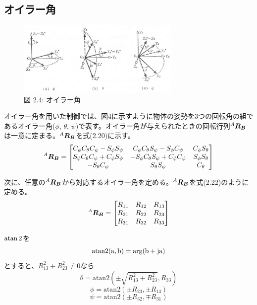 \documentclass{article}
\begin{document}
\subsection{オイラー角}
\begin{figure}[H]
    \centering
    \includegraphics[width=0.7\textwidth]{images/2_4.jpg}
    \caption{図 2.4: オイラー角}
    \label{fig:2.4}
\end{figure}

オイラー角を用いた制御では、図4に示すように物体の姿勢を3つの回転角の組であるオイラー角(\(\phi\), \(\theta\), \(\psi\))で表す。オイラー角が与えられたときの回転行列\(^{A}\vb*{R_B}\)は一意に定まる。\(^{A}\vb*{R_B}\)を式(2.20)に示す。
\begin{equation}
    ^{A}\vb*{R_B} = 
    \begin{bmatrix}
        C_{\phi}C_{\theta}C_{\psi}-S_{\phi}S_{\psi} & C_{\phi}C_{\theta}S_{\psi}-S_{\phi}C_{\psi} & C_{\phi}S_{\theta} \\
        S_{\phi}C_{\theta}C_{\psi}+C_{\phi}S_{\psi} & -S_{\phi}C_{\theta}S_{\psi}+C_{\phi}C_{\psi} & S_{\phi}S_{\theta} \\
        -S_{\theta}C_{\psi} & S_{\theta}S_{\psi} & C_{\theta}
    \end{bmatrix}
\end{equation}

次に、任意の\(^{A}\vb*{R_B}\)から対応するオイラー角を定める。\(^{A}\vb*{R_B}\)を式(2.22)のように定める。
\begin{equation}
    ^{A}\vb*{R_B} = 
    \begin{bmatrix}
        R_{11} & R_{12} & R_{13} \\
        R_{21} & R_{22} & R_{23} \\
        R_{31} & R_{32} & R_{33}
    \end{bmatrix}
\end{equation}

\(\atan2\)を\\
\begin{equation}
    \rm{atan2}(a,b) = \rm{arg}(b+ja)
\end{equation}
とすると、\({R_{13}^2+R_{23}^2} \neq 0\)なら
\begin{equation}
    \theta = \mathrm{atan2} \left(\pm \sqrt{R_{13}^2+R_{23}^2}, R_{33} \right)
\end{equation}
\begin{equation}
    \phi = \mathrm{atan2} \left(\pm R_{23}, \pm R_{13} \right)
\end{equation}
\begin{equation}
    \psi = \mathrm{atan2} \left(\pm R_{32}, \mp R_{31} \right)
\end{equation}
\end{document}
